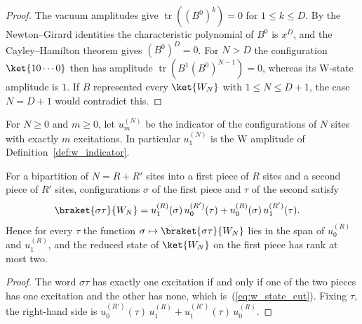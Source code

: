 \begin{proof}
    \leanok
    The vacuum amplitudes give $\operatorname{tr}((B^0)^k)=0$ for
    $1\leq k\leq D$. By the Newton--Girard identities the characteristic
    polynomial of $B^0$ is $x^D$, and the Cayley--Hamilton theorem gives
    $(B^0)^D=0$. For $N>D$ the configuration $\ket{10\cdots0}$ then has
    amplitude $\operatorname{tr}(B^1(B^0)^{N-1})=0$, whereas its W-state
    amplitude is $1$. If $B$ represented every $\ket{W_N}$ with
    $1\leq N\leq D+1$, the case $N=D+1$ would contradict this.
\end{proof}

\begin{definition}\label{def:weight_indicator}
    \leanok
    For $N\geq0$ and $m\geq0$, let $u^{(N)}_m$ be the indicator of the
    configurations of $N$ sites with exactly $m$ excitations. In particular
    $u^{(N)}_1$ is the W amplitude of Definition~\ref{def:w_indicator}.
\end{definition}

\begin{lemma}\label{lem:w_state_cut_rank}
    \leanok
    For a bipartition of $N=R+R'$ sites into a first piece of $R$ sites and a
    second piece of $R'$ sites, configurations $\sigma$ of the first piece and
    $\tau$ of the second satisfy
    \begin{align}
        \braket{\sigma\tau}{W_N}
         & =u^{(R)}_1(\sigma)\,u^{(R')}_0(\tau)+u^{(R)}_0(\sigma)\,u^{(R')}_1(\tau).
        \label{eq:w_state_cut}
    \end{align}
    Hence for every $\tau$ the function $\sigma\mapsto\braket{\sigma\tau}{W_N}$
    lies in the span of $u^{(R)}_0$ and $u^{(R)}_1$, and the reduced state of
    $\ket{W_N}$ on the first piece has rank at most two.
\end{lemma}

\begin{proof}
    \leanok
    The word $\sigma\tau$ has exactly one excitation if and only if one of the two
    pieces has one excitation and the other has none, which
    is~(\ref{eq:w_state_cut}). Fixing $\tau$, the right-hand side is
    $u^{(R')}_0(\tau)\,u^{(R)}_1+u^{(R')}_1(\tau)\,u^{(R)}_0$.
\end{proof}

